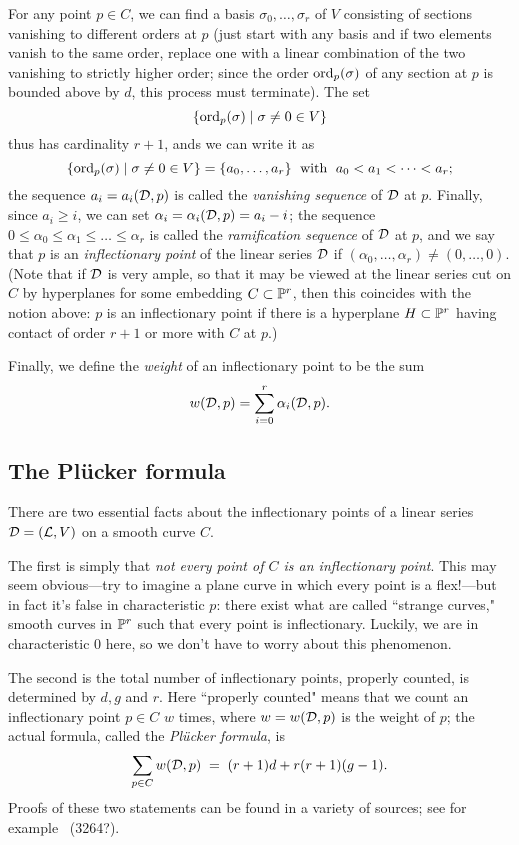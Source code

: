 For any point $p \in C$, we can find a basis $\sigma_0, \dots, \sigma_r$ of $V$ consisting of sections vanishing to different orders at $p$ (just start with any basis and if two elements vanish to the same order, replace one with a linear combination of the two vanishing to strictly higher order; since the order $\ord_p(\sigma)$ of any section at $p$ is bounded above by $d$, this process must terminate). The set
$$
\{ \ord_p(\sigma) \mid \sigma \neq 0 \in V \}
$$
thus has cardinality $r+1$, ands we can write it as
$$
\{ \ord_p(\sigma) \mid \sigma \neq 0 \in V \} = \{a_0,\dots,a_r\} \; \text{ with } \; a_0 < a_1 < \dots < a_r;
$$
the sequence $a_i = a_i(\cD,p)$ is called the \emph{vanishing sequence} of $\cD$ at $p$.  Finally, since $a_i \geq i$, we can set $\alpha_i = \alpha_i(\cD,p) = a_i - i$; the sequence $0 \leq \alpha_0 \leq \alpha_1 \leq \dots \leq \alpha_r$ is called the \emph{ramification sequence} of $\cD$ at $p$, and we say that $p$ is an \emph{inflectionary point} of the linear series $\cD$ if $(\alpha_0,\dots,\alpha_r) \neq (0,\dots,0)$. (Note that if $\cD$ is very ample, so that it may be viewed at the linear series cut on $C$ by hyperplanes for some embedding $C \subset \PP^r$, then this coincides with the notion above: $p$ is an inflectionary point if there is a hyperplane $H \subset \PP^r$ having contact of order $r+1$ or more with $C$ at $p$.)

Finally, we define the \emph{weight} of an inflectionary point to be the sum
$$
w(\cD, p) = \sum_{i=0}^r \alpha_i(\cD, p).
$$

\subsection{The Pl\"ucker formula}

There are two essential facts about the inflectionary points of a linear series $\cD = (\cL,V)$ on a smooth curve $C$.

The first is simply that \emph{not every point of $C$ is an inflectionary point}. This may seem obvious---try to imagine a plane curve in which every point is a flex!---but in fact it's false in characteristic $p$: there exist what are called ``strange curves," smooth curves in $\PP^r$ such that every point is inflectionary. Luckily, we are in characteristic 0 here, so we don't have to worry about this phenomenon.

The second is the total number of inflectionary points, properly counted, is determined by $d, g$ and $r$. Here ``properly counted" means that we count an inflectionary point $p \in C$ $w$ times, where $w = w(\cD,p)$ is the weight of $p$; the actual formula, called the \emph{Pl\"ucker formula}, is
$$
\sum_{p \in C} w(\cD, p) \; = \; (r+1)d + r(r+1)(g-1).
$$
Proofs of these two statements can be found in a variety of sources; see for example~\cite{} (3264?). 

